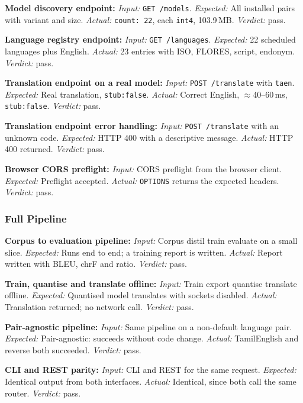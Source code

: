 \begin{bullets}
\item \textbf{Model discovery endpoint:} \emph{Input:} \texttt{GET /models}. \emph{Expected:} All installed pairs with variant and size. \emph{Actual:} \texttt{count: 22}, each \texttt{int4}, 103.9\,MB. \emph{Verdict:} pass.
\item \textbf{Language registry endpoint:} \emph{Input:} \texttt{GET /languages}. \emph{Expected:} 22 scheduled languages plus English. \emph{Actual:} 23 entries with ISO, FLORES, script, endonym. \emph{Verdict:} pass.
\item \textbf{Translation endpoint on a real model:} \emph{Input:} \texttt{POST /translate} with \texttt{ta}\arrowto{}\texttt{en}. \emph{Expected:} Real translation, \texttt{stub:false}. \emph{Actual:} Correct English, $\approx$40--60\,ms, \texttt{stub:false}. \emph{Verdict:} pass.
\item \textbf{Translation endpoint error handling:} \emph{Input:} \texttt{POST /translate} with an unknown code. \emph{Expected:} HTTP 400 with a descriptive message. \emph{Actual:} HTTP 400 returned. \emph{Verdict:} pass.
\item \textbf{Browser CORS preflight:} \emph{Input:} CORS preflight from the browser client. \emph{Expected:} Preflight accepted. \emph{Actual:} \texttt{OPTIONS} returns the expected headers. \emph{Verdict:} pass.
\end{bullets}

\subsubsection{Full Pipeline}

\begin{bullets}
\item \textbf{Corpus to evaluation pipeline:} \emph{Input:} Corpus \arrowto{} distil \arrowto{} train \arrowto{} evaluate on a small slice. \emph{Expected:} Runs end to end; a training report is written. \emph{Actual:} Report written with BLEU, chrF and ratio. \emph{Verdict:} pass.
\item \textbf{Train, quantise and translate offline:} \emph{Input:} Train \arrowto{} export \arrowto{} quantise \arrowto{} translate offline. \emph{Expected:} Quantised model translates with sockets disabled. \emph{Actual:} Translation returned; no network call. \emph{Verdict:} pass.
\item \textbf{Pair-agnostic pipeline:} \emph{Input:} Same pipeline on a non-default language pair. \emph{Expected:} Pair-agnostic: succeeds without code change. \emph{Actual:} Tamil\arrowto{}English and reverse both succeeded. \emph{Verdict:} pass.
\item \textbf{CLI and REST parity:} \emph{Input:} CLI and REST for the same request. \emph{Expected:} Identical output from both interfaces. \emph{Actual:} Identical, since both call the same router. \emph{Verdict:} pass.
\end{bullets}

